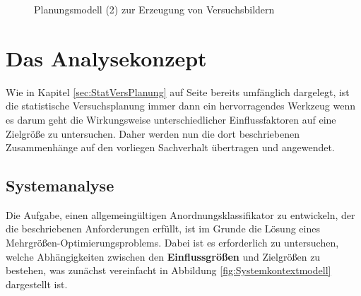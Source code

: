 \documentclass[
fontsize=10pt, 
listof = totoc,
parskip = half	
]{report}
\begin{document}
\begin{figure}[H]

	\caption{Planungsmodell (2) zur Erzeugung von Versuchsbildern}
	\label{fig:Planungsmodell(2)}
\end{figure}


\section{Das Analysekonzept}

Wie in Kapitel \ref{sec:StatVersPlanung} auf Seite \pageref{sec:StatVersPlanung} bereits umfänglich dargelegt, ist die statistische Versuchsplanung immer dann ein hervorragendes Werkzeug wenn es darum geht die Wirkungsweise unterschiedlicher Einflussfaktoren auf eine Zielgröße zu untersuchen. Daher werden nun die dort beschriebenen Zusammenhänge auf den vorliegen Sachverhalt übertragen und angewendet.


\subsection{Systemanalyse}
Die Aufgabe, einen allgemeingültigen Anordnungsklassifikator zu entwickeln, der die beschriebenen Anforderungen erfüllt, ist im Grunde die Lösung eines Mehrgrößen-Optimierungsproblems. Dabei ist es erforderlich zu untersuchen, welche Abhängigkeiten zwischen den \textbf{Einflussgrößen} und Zielgrößen zu bestehen, was zunächst vereinfacht in Abbildung \ref{fig:Systemkontextmodell} dargestellt ist.
       
\end{document}
